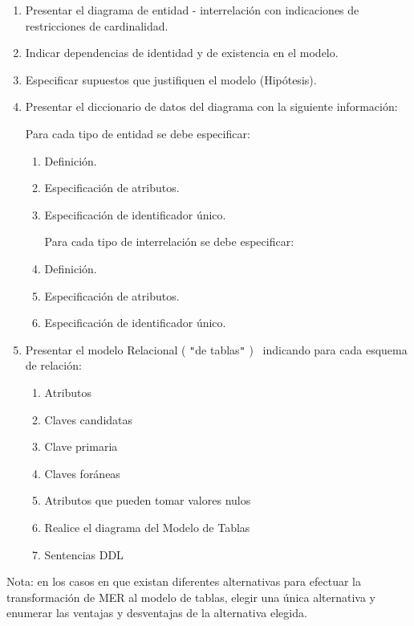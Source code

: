 \documentclass[a4paper,11pt]{article}
\begin{document}
\begin{enumerate}
\item Presentar el diagrama de entidad - interrelación con indicaciones de restricciones 
de cardinalidad. 

\item Indicar dependencias de identidad y de existencia en el modelo. 

\item Especificar supuestos que justifiquen el modelo (Hipótesis). 

\item Presentar el diccionario de datos del diagrama con la siguiente información: 

Para cada tipo de entidad se debe especificar:

\begin{enumerate}
\item Definición. 

\item Especificación de atributos. 

\item Especificación de identificador único. 

Para cada tipo de interrelación se debe especificar: ~ 

\item Definición. 

\item Especificación de atributos. 

\item Especificación de identificador único. 
\end{enumerate}

\item Presentar el modelo Relacional ( \texttt{"}de tablas\texttt{"} )~ indicando 
para cada esquema de relación: 

\begin{enumerate}
\item Atributos 

\item Claves candidatas

\item Clave primaria

\item Claves foráneas 

\item Atributos que pueden tomar valores nulos

\item Realice el diagrama del Modelo de Tablas

\item Sentencias DDL
\end{enumerate}
\end{enumerate}

Nota: en los casos en que existan diferentes alternativas para efectuar la transformación 
de MER al modelo de tablas, elegir una única alternativa y enumerar las ventajas 
y desventajas de la alternativa elegida. \pagebreak{}\label{HToc293405800}
\end{document}
